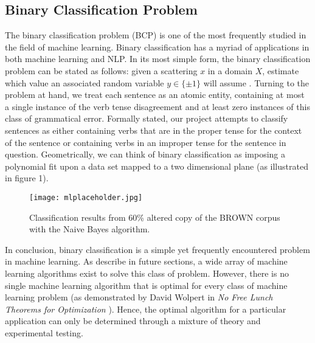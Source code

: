 \documentclass{article}
\begin{document}
\subsection{Binary Classification Problem}
The binary classification problem (BCP) is one of the most frequently studied in the field of machine learning. Binary classification has a myriad of applications in both machine learning and NLP. In its most simple form, the binary classification problem can be stated as follows: given a scattering $x$ in a domain $X$, estimate which value an associated random variable $y \in \{ \pm 1\}$ will assume \citep{Smola08introductionto}. Turning to the problem at hand, we  treat each sentence as an atomic entity, containing at most a single instance of the verb tense disagreement and at least zero instances of this class of grammatical error. Formally stated, our project  attempts to classify sentences as either containing verbs that are in the proper tense for the context of the sentence or containing verbs in an improper tense for the sentence in question. 
Geometrically, we can think of binary classification as imposing a polynomial fit upon  a data set mapped to a two dimensional plane (as illustrated in figure 1). 
\begin{center}
\begin{figure}[h!]
\centering
\texttt{[image: mlplaceholder.jpg]}
\caption{Classification results from 60\% altered copy of the BROWN corpus with the Naive Bayes algorithm.}
\label{fig:univerise}
\end{figure}
\end{center}
In conclusion, binary classification is a simple yet frequently encountered problem in machine learning.  As describe in future sections, a wide array of machine learning algorithms exist to solve this class of problem. However, there is no single machine learning algorithm that is optimal for every class of machine learning problem (as demonstrated by David Wolpert in \textit{No Free Lunch Theorems for Optimization} \citep{ref1}). Hence, the optimal algorithm for a particular application can only be determined through a mixture of theory and experimental testing. 
\end{document}
